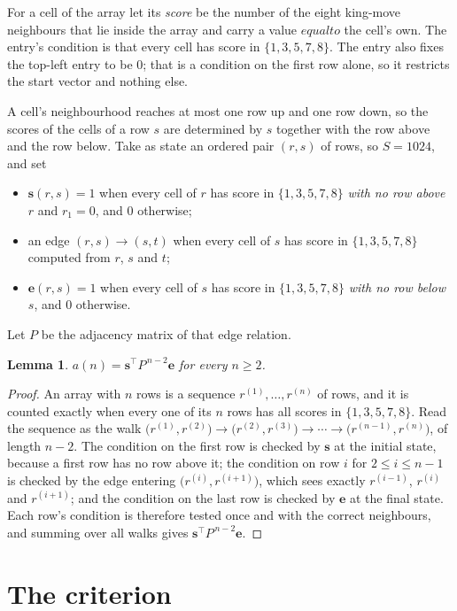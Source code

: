 \documentclass[11pt,a4paper]{article}
\theoremstyle{plain}
\newtheorem{lemma}[theorem]{Lemma}
\theoremstyle{definition}
\begin{document}
For a cell of the array let its \emph{score} be the number of the eight king-move neighbours that lie inside
the array and carry a value $equal to$ the cell's own. The entry's condition is that every cell
has score in $\{1,3,5,7,8\}$. The entry also fixes the top-left entry to be $0$; that is a condition on the first row alone, so it restricts the start vector and nothing else.

A cell's neighbourhood reaches at most one row up and one row down, so the scores of the
cells of a row $s$ are determined by $s$ together with the row above and the row below.
Take as state an ordered pair $(r,s)$ of rows, so $S=1024$, and set
\begin{itemize}
\item $\mathbf{s}(r,s)=1$ when every cell of $r$ has score in $\{1,3,5,7,8\}$ \emph{with no row
above $r$} and $r_1=0$, and $0$ otherwise;
\item an edge $(r,s)\to(s,t)$ when every cell of $s$ has score in $\{1,3,5,7,8\}$ computed from
$r$, $s$ and $t$;
\item $\mathbf{e}(r,s)=1$ when every cell of $s$ has score in $\{1,3,5,7,8\}$ \emph{with no row
below $s$}, and $0$ otherwise.
\end{itemize}
Let $P$ be the adjacency matrix of that edge relation.

\begin{lemma}\label{lem:walk}
$a(n)=\mathbf{s}^{\!\top}P^{\,n-2}\mathbf{e}$ for every $n\ge2$.
\end{lemma}

\begin{proof}
An array with $n$ rows is a sequence $r^{(1)},\dots,r^{(n)}$ of rows, and it is counted
exactly when every one of its $n$ rows has all scores in $\{1,3,5,7,8\}$. Read the sequence as the
walk $\bigl(r^{(1)},r^{(2)}\bigr)\to\bigl(r^{(2)},r^{(3)}\bigr)\to\cdots\to
\bigl(r^{(n-1)},r^{(n)}\bigr)$, of length $n-2$. The condition on the first row is
checked by $\mathbf{s}$ at the initial state, because a first row has no row above it; the
condition on row $i$ for $2\le i\le n-1$ is checked by the edge entering
$\bigl(r^{(i)},r^{(i+1)}\bigr)$, which sees exactly $r^{(i-1)}$, $r^{(i)}$ and
$r^{(i+1)}$; and the condition on the last row is checked by $\mathbf{e}$ at the final
state. Each row's condition is therefore tested once and with the correct neighbours, and
summing over all walks gives $\mathbf{s}^{\!\top}P^{\,n-2}\mathbf{e}$.
\end{proof}

\section{The criterion}
\end{document}
